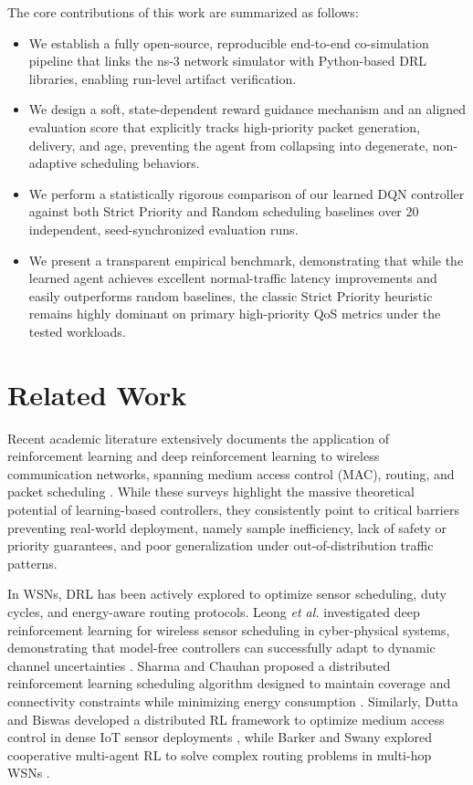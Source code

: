 \documentclass[runningheads,a4paper]{llncs}
\begin{document}
The core contributions of this work are summarized as follows:
\begin{itemize}
    \item We establish a fully open-source, reproducible end-to-end co-simulation pipeline that links the ns-3 network simulator with Python-based DRL libraries, enabling run-level artifact verification.
    \item We design a soft, state-dependent reward guidance mechanism and an aligned evaluation score that explicitly tracks high-priority packet generation, delivery, and age, preventing the agent from collapsing into degenerate, non-adaptive scheduling behaviors.
    \item We perform a statistically rigorous comparison of our learned DQN controller against both Strict Priority and Random scheduling baselines over 20 independent, seed-synchronized evaluation runs.
    \item We present a transparent empirical benchmark, demonstrating that while the learned agent achieves excellent normal-traffic latency improvements and easily outperforms random baselines, the classic Strict Priority heuristic remains highly dominant on primary high-priority QoS metrics under the tested workloads.
\end{itemize}

\section{Related Work}
Recent academic literature extensively documents the application of reinforcement learning and deep reinforcement learning to wireless communication networks, spanning medium access control (MAC), routing, and packet scheduling \cite{luong2019drlsurvey,frikha2021wrlsurvey}. While these surveys highlight the massive theoretical potential of learning-based controllers, they consistently point to critical barriers preventing real-world deployment, namely sample inefficiency, lack of safety or priority guarantees, and poor generalization under out-of-distribution traffic patterns.

In WSNs, DRL has been actively explored to optimize sensor scheduling, duty cycles, and energy-aware routing protocols. Leong \textit{et al.} investigated deep reinforcement learning for wireless sensor scheduling in cyber-physical systems, demonstrating that model-free controllers can successfully adapt to dynamic channel uncertainties \cite{leong2020automatica}. Sharma and Chauhan proposed a distributed reinforcement learning scheduling algorithm designed to maintain coverage and connectivity constraints while minimizing energy consumption \cite{sharma2020wsn}. Similarly, Dutta and Biswas developed a distributed RL framework to optimize medium access control in dense IoT sensor deployments \cite{dutta2022comnet}, while Barker and Swany explored cooperative multi-agent RL to solve complex routing problems in multi-hop WSNs \cite{barker2022wcnc}.
\end{document}
